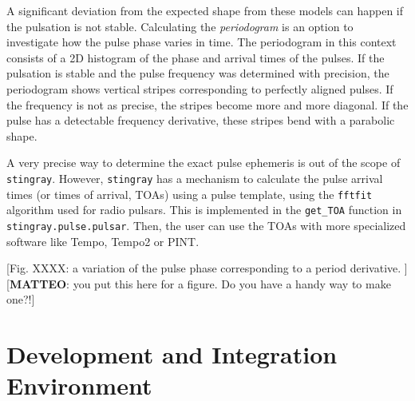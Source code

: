 \documentclass[twocolumn]{aastex62}
\newcommand{\stingray}{\texttt{stingray}\xspace}
\begin{document}
A significant deviation from the expected shape from these models can happen if the pulsation is not stable.
Calculating the \textit{periodogram} is an option to investigate how the pulse phase varies in time.
The periodogram in this context consists of a 2D histogram of the phase and arrival times of the pulses. 
If the pulsation is stable and the pulse frequency was determined with precision, the periodogram shows vertical stripes corresponding to perfectly aligned pulses.
If the frequency is not as precise, the stripes become more and more diagonal.
If the pulse has a detectable frequency derivative, these stripes bend with a parabolic shape.

A very precise way to determine the exact pulse ephemeris is out of the scope of \stingray. 
However, \stingray has a mechanism to calculate the pulse arrival times (or times of arrival, TOAs) using a pulse template, using the \texttt{fftfit} algorithm used for radio pulsars. 
This is implemented in the \texttt{get\_TOA} function in \texttt{stingray.pulse.pulsar}.
Then, the user can use the TOAs with more specialized software like Tempo, Tempo2 or PINT.

[Fig. XXXX: a variation of the pulse phase corresponding to a period derivative. ]
[\textbf{MATTEO}: you put this here for a figure. Do you have a handy way to make one?!]



\section{Development and Integration Environment}
\label{sec:development}
\end{document}
